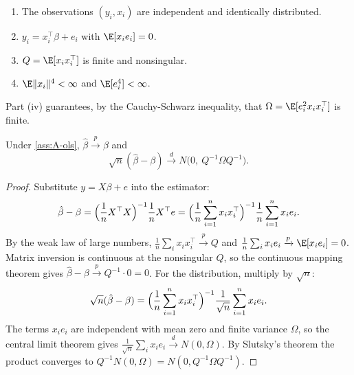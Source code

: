 \begin{assumption}\label{ass:A-ols}
\leavevmode
\begin{enumerate}[label=(\roman*)]
\item The observations $(y_i, x_i)$ are independent and identically distributed.
\item $y_i = x_i^\top\beta + e_i$ with $\E[x_i e_i] = 0$.
\item $Q = \E[x_i x_i^\top]$ is finite and nonsingular.
\item $\E\lVert x_i\rVert^4 < \infty$ and $\E[e_i^4] < \infty$.
\end{enumerate}
\end{assumption}

Part (iv) guarantees, by the Cauchy-Schwarz inequality, that $\Omega = \E[e_i^2x_ix_i^\top]$ is finite.

\begin{proposition}\label{prop:A-ols-asy}
Under \cref{ass:A-ols}, $\hat\beta \xrightarrow{p} \beta$ and
\begin{equation}\label{eq:A-ols-sandwich}
\sqrt{n}(\hat\beta - \beta) \xrightarrow{d} N\bigl(0,\ Q^{-1}\Omega Q^{-1}\bigr) .
\end{equation}
\end{proposition}

\begin{proof}
Substitute $y = X\beta + e$ into the estimator:
\begin{equation*}
\hat\beta - \beta = \Bigl(\frac{1}{n}X^\top X\Bigr)^{-1}\frac{1}{n}X^\top e
= \Bigl(\frac{1}{n}\sum_{i=1}^n x_ix_i^\top\Bigr)^{-1}\frac{1}{n}\sum_{i=1}^n x_ie_i .
\end{equation*}
By the weak law of large numbers, $\frac{1}{n}\sum_i x_ix_i^\top \xrightarrow{p} Q$ and
$\frac{1}{n}\sum_i x_ie_i \xrightarrow{p} \E[x_ie_i] = 0$. Matrix inversion is continuous at the nonsingular
$Q$, so the continuous mapping theorem gives $\hat\beta - \beta \xrightarrow{p} Q^{-1}\cdot 0 = 0$. For the
distribution, multiply by $\sqrt{n}$:
\begin{equation*}
\sqrt{n}(\hat\beta - \beta) = \Bigl(\frac{1}{n}\sum_{i=1}^n x_ix_i^\top\Bigr)^{-1}
\frac{1}{\sqrt{n}}\sum_{i=1}^n x_ie_i .
\end{equation*}
The terms $x_ie_i$ are independent with mean zero and finite variance $\Omega$, so the central limit theorem
gives $\frac{1}{\sqrt{n}}\sum_i x_ie_i \xrightarrow{d} N(0, \Omega)$. By Slutsky's theorem the product
converges to $Q^{-1}N(0, \Omega) = N(0, Q^{-1}\Omega Q^{-1})$.
\end{proof}

